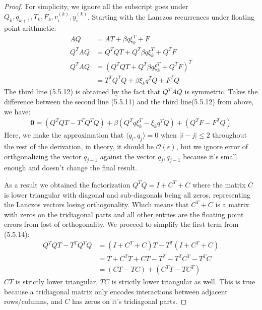 \documentclass[]{article}
\theoremstyle{definition}
\begin{document}
        \begin{proof}
            For simplicity, we ignore all the subscript goes under $Q_k, q_{k + 1}, T_k, F_k, v_i^{(k)}, y_i^{(k)}$. Starting with the Lanczos recurrences under floating point arithmetic: 
            \begin{align}
                AQ &= AT + \beta q\xi_k^T + F
                \\
                Q^TAQ &= Q^TQT + Q^T\beta q\xi_k^T + Q^TF
                \\
                Q^TAQ &= (Q^TQT + Q^T\beta q\xi_k^T + Q^TF)^T
                \\
                &= T^TQ^TQ  + \beta\xi_k q^T Q + F^TQ
            \end{align}
            The third line (5.5.12) is obtained by the fact that $Q^TAQ$ is symmetric. Takes the difference between the second line (5.5.11) and the third line(5.5.12) from above, we have: 
            \begin{align}
                \mathbf{0} = (Q^TQT - T^TQ^TQ) + \beta(Q^Tq\xi_k^T - \xi_k q^TQ) + (Q^TF - F^TQ)
            \end{align}
            Here, we make the approximation that $\langle q_i, q_j\rangle = 0$ when $|i - j| \le 2$ throughout the rest of the derivation, in theory, it should be $\mathcal{O}(\epsilon)$, but we ignore error of orthgonalizing the vector $q_{j + 1}$ against the vector $q_j, q_{j - 1}$ because it's small enough and doesn't change the final result. 
            \par
            As a result we obtained the factorization $Q^TQ = I + C^T + C$ where the matrix $C$ is lower triangular with diagonal and sub-diagonals being all zeros, representing the Lanczos vectors losing orthogonality. Which means that $C^T + C$ is a matrix with zeros on the tridiagonal parts and all other entries are the floating point errors from lost of orthogonality. We proceed to simplify the first term from (5.5.14): 
            \begin{align}
                    Q^TQT - T^TQ^TQ &= (I + C^T + C)T -T^T (I + C^T + C)
                    \\
                    &= T + C^TT + CT - T^T - T^TC^T - T^TC
                    \\
                    &= (CT - TC) + (C^TT - TC^T)
            \end{align}
            $CT$ is strictly lower triangular, $TC$ is strictly lower triangular as well. This is true because a tridiagonal matrix only encodes interactions between adjacent rows/columns, and $C$ has zeros on it's tridiagonal parts.

\end{proof}
\end{document}
